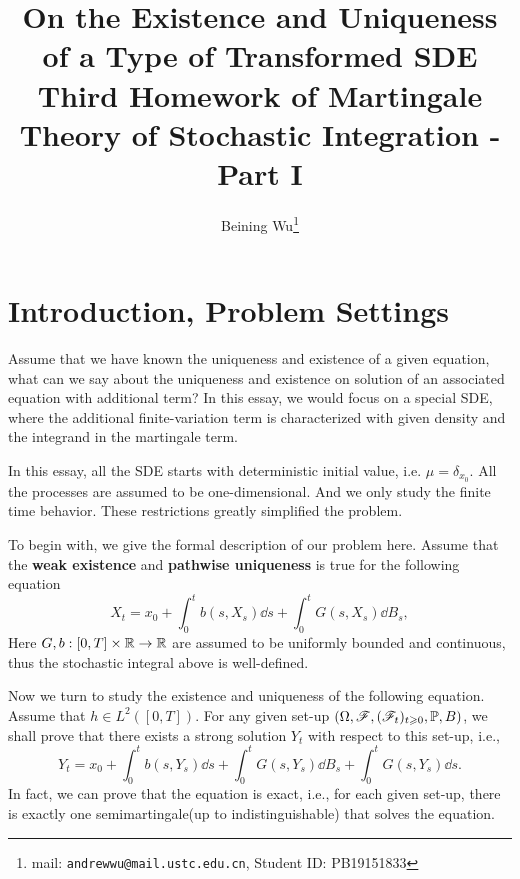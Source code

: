 \documentclass[8pt,onesided]{article}
\begin{document}
    
{
\title{\mc On the Existence and Uniqueness of a Type of Transformed SDE\vspace*{.5em}\\  \large Third Homework of Martingale Theory of Stochastic Integration - Part I}
\author{Beining Wu\footnote{mail: \texttt{andrewwu@mail.ustc.edu.cn}, Student ID: PB19151833}}
\maketitle
}

\section{Introduction, Problem Settings}

Assume that we have known the uniqueness and existence of a given equation, what can we say about the uniqueness and existence on solution of an associated equation with additional term? In this essay, we would focus on a special SDE, where the additional finite-variation term is characterized with given density and the integrand in the martingale term.

\begin{remark}
    In this essay, all the SDE starts with deterministic initial value, i.e. $\mu=\delta_{x_0}$. All the processes are assumed to be one-dimensional. And we only study the finite time behavior. These restrictions greatly simplified the problem.
\end{remark}

To begin with, we give the formal description of our problem here. Assume that the \textbf{weak existence} and \textbf{pathwise uniqueness} is true for the following equation
\begin{equation}
    \label{original}
    X_t=x_0+\int_0^t b(s,X_s) \dd s+\int_0^t G(s,X_s)\dd B_s,
\end{equation}
Here $G,b:[0,T]\times \mathbb{R}\to \mathbb{R}$ are assumed to be uniformly bounded and continuous, thus the stochastic integral above is well-defined. 

Now we turn to study the existence and uniqueness of the following equation. Assume that $h\in L^2([0,T])$. For any given set-up $(\Omega, \mathscr{F}, (\mathscr{F}_t)_{t\geqslant0}, \mathbb{P}, B)$, we shall prove that there exists a strong solution $Y_t$ with respect to this set-up, i.e.,
\begin{equation}
    \label{changed}
    Y_t=x_0+\int_0^t b(s,Y_s) \dd s+\int_0^t G(s,Y_s) \dd B_s +\int_0^t G(s,Y_s) \dd s.
\end{equation}
In fact, we can prove that the equation is exact, i.e., for each given set-up, there is exactly one semimartingale(up to indistinguishable) that solves the equation.
\end{document}
